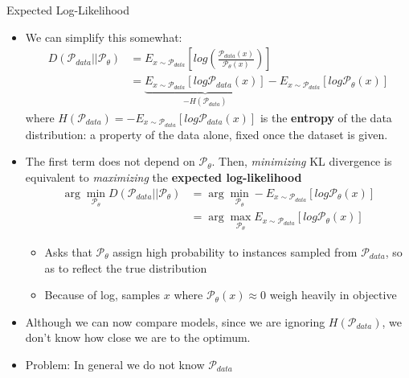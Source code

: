 \begin{frame}[allowframebreaks]{Expected Log-Likelihood}

\begin{itemize}
    \item We can simplify this somewhat:
    \begin{align*}
        D(\mathcal{P}_{data}||\mathcal{P}_{\theta}) & = E_{x \sim \mathcal{P}_{data}}   \left [log \left ( \frac{\mathcal{P}_{data}(x)}{\mathcal{P}_{\theta}(x)} \right ) \right ] \\
         & = \underbrace{E_{x \sim \mathcal{P}_{data}} [log \mathcal{P}_{data}(x)]}_{-H(\mathcal{P}_{data})} - E_{x \sim \mathcal{P}_{data}} [log \mathcal{P}_{\theta}(x)]
    \end{align*}
    where $H(\mathcal{P}_{data}) = -E_{x \sim \mathcal{P}_{data}}[log \mathcal{P}_{data}(x)]$ is the \textbf{entropy} of the data distribution: a property of the data alone, fixed once the dataset is given.

    \item The first term does not depend on $\mathcal{P}_{\theta}$. Then, \emph{minimizing} KL divergence is equivalent to \emph{maximizing} the \textbf{expected log-likelihood}
    \begin{align*}
        \arg\min_{\mathcal{P}_{\theta}} D(\mathcal{P}_{data}||\mathcal{P}_{\theta}) & = \arg\min_{\mathcal{P}_{\theta}} - E_{x \sim \mathcal{P}_{data}} [log \mathcal{P}_{\theta}(x)]\\
        & = \arg\max_{\mathcal{P}_{\theta}} E_{x \sim \mathcal{P}_{data}} [log \mathcal{P}_{\theta}(x)]
    \end{align*}

    \framebreak

    \begin{itemize}
        \item Asks that $\mathcal{P}_{\theta}$ assign high probability to instances sampled from $\mathcal{P}_{data}$, so as to reflect the true distribution
        \item Because of log, samples $x$ where $\mathcal{P}_{\theta}(x) \approx 0$ weigh heavily in objective
    \end{itemize}
    \item Although we can now compare models, since we are ignoring $H(\mathcal{P}_{data})$, we don’t know how close we are to the optimum.
    \item Problem: In general we do not know $\mathcal{P}_{data}$
\end{itemize}
\end{frame}

